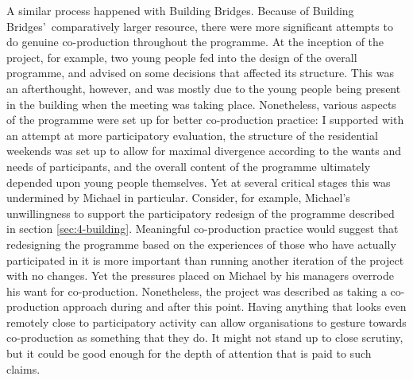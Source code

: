 A similar process happened with Building Bridges. Because of Building Bridges'\ comparatively larger resource, there were more significant attempts to do genuine co-production throughout the programme. At  the inception of the project, for example, two young people fed into the design of the overall programme, and advised on some decisions that affected its structure. This was an afterthought, however, and was mostly due to the young people being present in the building when the meeting was taking place. Nonetheless, various aspects of the programme were set up for better co-production practice: I supported with an attempt at more participatory evaluation, the structure of the residential weekends was set up to allow for maximal divergence according to the wants and needs of participants, and the overall content of the programme ultimately depended upon young people themselves. Yet at several critical stages this was undermined by Michael in particular. Consider, for example, Michael's unwillingness to support the participatory redesign of the programme described in section \ref{sec:4-building}. Meaningful co-production practice would suggest that redesigning the programme based on the experiences of those who have actually participated in it is more important than running another iteration of the project with no changes. Yet the pressures placed on Michael by his managers overrode his want for co-production. Nonetheless, the project was described as taking a co-production approach during and after this point. Having anything that looks even remotely close to participatory activity can allow organisations to gesture towards co-production as something that they do. It might not stand up to close scrutiny, but it could be good enough for the depth of attention that is paid to such claims. 

